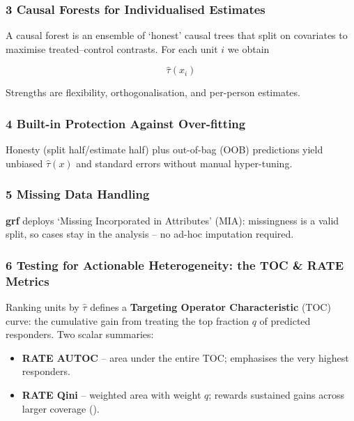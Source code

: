 \documentclass[
  single column]{article}
\providecommand{\tightlist}{%
  \setlength{\itemsep}{0pt}\setlength{\parskip}{0pt}}
\begin{document}
\subsubsection{3 Causal Forests for Individualised
Estimates}\label{causal-forests-for-individualised-estimates}

A causal forest is an ensemble of `honest' causal trees that split on
covariates to maximise treated--control contrasts. For each unit \(i\)
we obtain

\[
  \widehat{\tau}(x_i)
\]

Strengths are flexibility, orthogonalisation, and per-person estimates.

\subsubsection{4 Built-in Protection Against
Over-fitting}\label{built-in-protection-against-over-fitting}

Honesty (split half/estimate half) plus out-of-bag (OOB) predictions
yield unbiased \(\widehat{\tau}(x)\) and standard errors without manual
hyper-tuning.

\subsubsection{5 Missing Data Handling}\label{missing-data-handling}

\textbf{grf} deploys `Missing Incorporated in Attributes' (MIA):
missingness is a valid split, so cases stay in the analysis -- no ad-hoc
imputation required.

\subsubsection{\texorpdfstring{6 Testing for \textbf{Actionable}
Heterogeneity: the TOC \& RATE
Metrics}{6 Testing for Actionable Heterogeneity: the TOC \& RATE Metrics}}\label{testing-for-actionable-heterogeneity-the-toc-rate-metrics}

Ranking units by \(\widehat{\tau}\) defines a \textbf{Targeting Operator
Characteristic} (TOC) curve: the cumulative gain from treating the top
fraction \(q\) of predicted responders. Two scalar summaries:

\begin{itemize}
\tightlist
\item
  \textbf{RATE AUTOC} -- area under the entire TOC; emphasises the very
  highest responders.
\item
  \textbf{RATE Qini} -- weighted area with weight \(q\); rewards
  sustained gains across larger coverage
  ().
\end{itemize}
\end{document}

